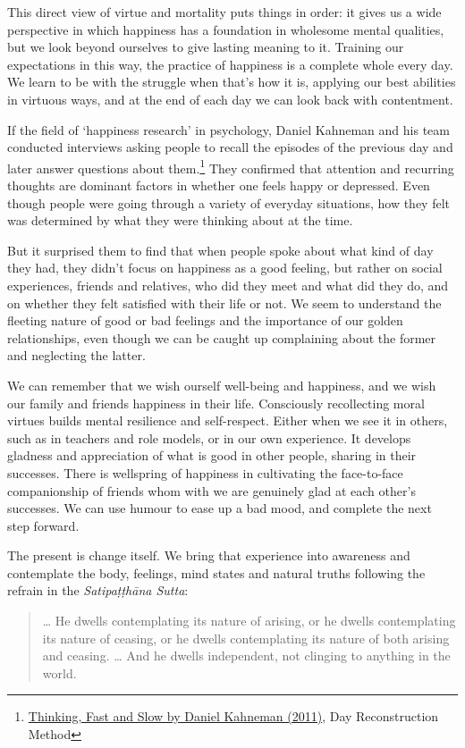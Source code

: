 This direct view of virtue and mortality puts things in order: it gives
us a wide perspective in which happiness has a foundation in wholesome
mental qualities, but we look beyond ourselves to give lasting meaning
to it. Training our expectations in this way, the practice of happiness
is a complete whole every day. We learn to be with the struggle when
that's how it is, applying our best abilities in virtuous ways, and at
the end of each day we can look back with contentment.

If the field of `happiness research' in psychology, Daniel Kahneman and
his team conducted interviews asking people to recall the episodes of
the previous day and later answer questions about them.\footnote{\href{https://www.goodreads.com/book/show/11468377-thinking-fast-and-slow}{Thinking,
  Fast and Slow by Daniel Kahneman (2011)}, Day Reconstruction Method}
They confirmed that attention and recurring thoughts are dominant
factors in whether one feels happy or depressed. Even though people were
going through a variety of everyday situations, how they felt was
determined by what they were thinking about at the time.

But it surprised them to find that when people spoke about what kind of
day they had, they didn't focus on happiness as a good feeling, but
rather on social experiences, friends and relatives, who did they meet
and what did they do, and on whether they felt satisfied with their life
or not. We seem to understand the fleeting nature of good or bad
feelings and the importance of our golden relationships, even though we
can be caught up complaining about the former and neglecting the latter.

We can remember that we wish ourself well-being and happiness, and we
wish our family and friends happiness in their life. Consciously
recollecting moral virtues builds mental resilience and self-respect.
Either when we see it in others, such as in teachers and role models, or
in our own experience. It develops gladness and appreciation of what is
good in other people, sharing in their successes. There is wellspring of
happiness in cultivating the face-to-face companionship of friends whom
with we are genuinely glad at each other's successes. We can use humour
to ease up a bad mood, and complete the next step forward.

The present is change itself. We bring that experience into awareness
and contemplate the body, feelings, mind states and natural truths
following the refrain in the \emph{Satipaṭṭhāna Sutta}:

\begin{quote}
\ldots{} He dwells contemplating its nature of arising, or he dwells
contemplating its nature of ceasing, or he dwells contemplating its
nature of both arising and ceasing. \ldots{} And he dwells independent,
not clinging to anything in the world.

\bigskip

\end{quote}
